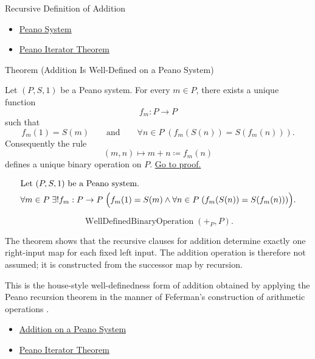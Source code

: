 \begin{topicbox}{Recursive Definition of Addition}
\begin{dependencies}
\begin{itemize}
  \item \hyperref[def:peano-system]{Peano System}
  \item \hyperref[thm:peano-iterator-theorem]{Peano Iterator Theorem}
\end{itemize}
\end{dependencies}

\begin{theorembox}{Theorem (Addition Is Well-Defined on a Peano System)}
\begin{theorem}
\label{thm:addition-well-defined-on-peano-system}
Let $(P,S,1)$ be a Peano system. For every $m \in P$, there exists a unique
function
\[
f_m : P \to P
\]
such that
\[
f_m(1)=S(m)
\qquad\text{and}\qquad
\forall n \in P\;(f_m(S(n))=S(f_m(n))).
\]
Consequently the rule
\[
(m,n) \longmapsto m+n \coloneqq f_m(n)
\]
defines a unique binary operation on $P$.
\hyperref[prf:addition-well-defined-on-peano-system]{Go to proof.}
\end{theorem}
\end{theorembox}

\begin{remark*}
\[
\begin{aligned}
&\text{Let } (P,S,1) \text{ be a Peano system.}\\
&\forall m \in P\;\exists! f_m : P \to P\;
\Bigl(f_m(1)=S(m) \land
\forall n \in P\;(f_m(S(n))=S(f_m(n)))\Bigr).
\end{aligned}
\]
\end{remark*}

\begin{remark*}
\[
\operatorname{WellDefinedBinaryOperation}(+_P,P).
\]
\end{remark*}

\begin{remark*}[Interpretation]
The theorem shows that the recursive clauses for addition determine exactly one
right-input map for each fixed left input. The addition operation is therefore
not assumed; it is constructed from the successor map by recursion.


This is the house-style well-definedness form of addition obtained by applying
the Peano recursion theorem in the manner of Feferman's construction of
arithmetic operations \citep{FefermanNumberSystems1964}.
\end{remark*}

\begin{dependencies}
\begin{itemize}
  \item \hyperref[def:addition-on-peano-system]{Addition on a Peano System}
  \item \hyperref[thm:peano-iterator-theorem]{Peano Iterator Theorem}
\end{itemize}
\end{dependencies}
\end{topicbox}

